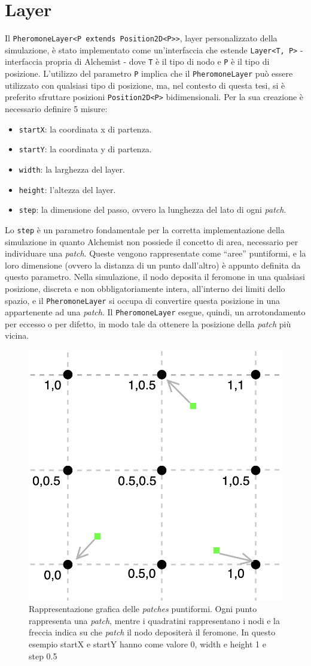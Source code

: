 \section{Layer}\label{layer}
Il \texttt{PheromoneLayer<P extends Position2D<P>>}, layer personalizzato della simulazione, è stato implementato 
come un'interfaccia che estende \texttt{Layer<T, P>} - interfaccia propria di Alchemist - 
dove \texttt{T} è il tipo di nodo e \texttt{P} è il tipo di posizione. 
L'utilizzo del parametro \texttt{P} implica che il \texttt{PheromoneLayer} può essere utilizzato con qualsiasi tipo di posizione, ma, nel contesto di questa tesi,
si è preferito sfruttare posizioni \texttt{Position2D<P>} bidimensionali.
Per la sua creazione è necessario definire 5 misure:
\begin{itemize}
    \item \texttt{startX}: la coordinata x di partenza.
    \item \texttt{startY}: la coordinata y di partenza.
    \item \texttt{width}: la larghezza del layer.
    \item \texttt{height}: l'altezza del layer.
    \item \texttt{step}: la dimensione del passo, ovvero la lunghezza del lato di ogni \textit{patch}.
\end{itemize}
Lo \texttt{step} è un parametro fondamentale per la corretta implementazione della simulazione
in quanto Alchemist non possiede il concetto di area, necessario per individuare una \textit{patch}.
Queste vengono rappresentate come ``aree'' puntiformi, e la loro dimensione (ovvero la distanza di un punto dall'altro) è appunto definita da questo parametro.
Nella simulazione, il nodo deposita il feromone in una qualsiasi posizione, discreta e non obbligatoriamente intera, all'interno dei limiti dello spazio, e il \texttt{PheromoneLayer} 
si occupa di convertire questa posizione in una appartenente ad una \textit{patch}. 
Il \texttt{PheromoneLayer} esegue, quindi, un arrotondamento per eccesso o per difetto, in modo tale da ottenere la posizione della \textit{patch} più vicina.
\begin{figure}[ht]
    \centering
    \includegraphics[width=.3\linewidth]{figures/patch-nodi.png}
    \caption{Rappresentazione grafica delle \textit{patches} puntiformi. Ogni punto rappresenta una \textit{patch},
    mentre i quadratini rappresentano i nodi e la freccia indica su che \textit{patch} il nodo depositerà il feromone. In questo esempio
    startX e startY hanno come valore 0, width e height 1 e step 0.5}\label{fig:patch-nodi}
\end{figure}

